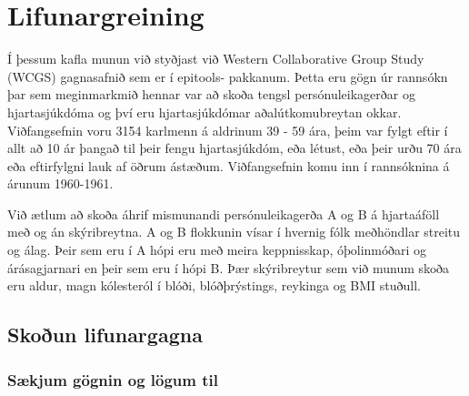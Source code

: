 \documentclass[
]{book}
\begin{document}
\hypertarget{lif}{%
\chapter{Lifunargreining}\label{lif}}

Í þessum kafla munun við styðjast við Western Collaborative Group Study (WCGS) gagnasafnið sem er í epitools- pakkanum. Þetta eru gögn úr rannsókn þar sem meginmarkmið hennar var að skoða tengsl persónuleikagerðar og hjartasjúkdóma og því eru hjartasjúkdómar aðalútkomubreytan okkar. Viðfangsefnin voru 3154 karlmenn á aldrinum 39 - 59 ára, þeim var fylgt eftir í allt að 10 ár þangað til þeir fengu hjartasjúkdóm, eða létust, eða þeir urðu 70 ára eða eftirfylgni lauk af öðrum ástæðum. Viðfangsefnin komu inn í rannsóknina á árunum 1960-1961.

Við ætlum að skoða áhrif mismunandi persónuleikagerða A og B á hjartaáföll með og án skýribreytna. A og B flokkunin vísar í hvernig fólk meðhöndlar streitu og álag. Þeir sem eru í A hópi eru með meira keppnisskap, óþolinmóðari og árásagjarnari en þeir sem eru í hópi B. Þær skýribreytur sem við munum skoða eru aldur, magn kólesteról í blóði, blóðþrýstings, reykinga og BMI stuðull.

\hypertarget{lif_skod}{%
\section{Skoðun lifunargagna}\label{lif_skod}}

\hypertarget{suxe6kjum-guxf6gnin-og-luxf6gum-til}{%
\subsection{Sækjum gögnin og lögum til}\label{suxe6kjum-guxf6gnin-og-luxf6gum-til}}
\end{document}
